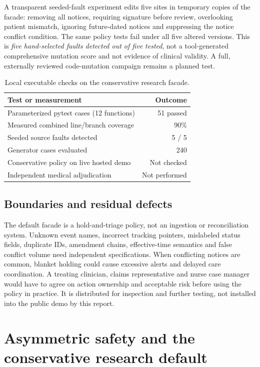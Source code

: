 \documentclass[11pt,twocolumn]{article}
\begin{document}
A transparent seeded-fault experiment edits five sites in temporary copies of the facade: removing all notices, requiring signature before review, overlooking patient mismatch, ignoring future-dated notices and suppressing the notice conflict condition. The same policy tests fail under all five altered versions. This is \emph{five hand-selected faults detected out of five tested}, not a tool-generated comprehensive mutation score and not evidence of clinical validity. A full, externally reviewed code-mutation campaign remains a planned test.

\begin{table}[ht]\centering\small\caption{Local executable checks on the conservative research facade.}\label{tab:policytests}
\begin{tabular}{@{}p{}r@{}}\toprule
Test or measurement & Outcome \\\midrule
Parameterized pytest cases (12 functions) & 51 passed \\
Measured combined line/branch coverage & 90\% \\
Seeded source faults detected & 5 / 5 \\
Generator cases evaluated & 240 \\
Conservative policy on live hosted demo & Not checked \\
Independent medical adjudication & Not performed \\\bottomrule
\end{tabular}
\end{table}

\subsection{Boundaries and residual defects}
The default facade is a hold-and-triage policy, not an ingestion or reconciliation system. Unknown event names, incorrect tracking pointers, mislabeled status fields, duplicate IDs, amendment chains, effective-time semantics and false conflict volume need independent specifications. When conflicting notices are common, blanket holding could cause excessive alerts and delayed care coordination. A treating clinician, claims representative and nurse case manager would have to agree on action ownership and acceptable risk before using the policy in practice. It is distributed for inspection and further testing, not installed into the public demo by this report.

\section{Asymmetric safety and the conservative research default}\label{sec:safety}
\end{document}
